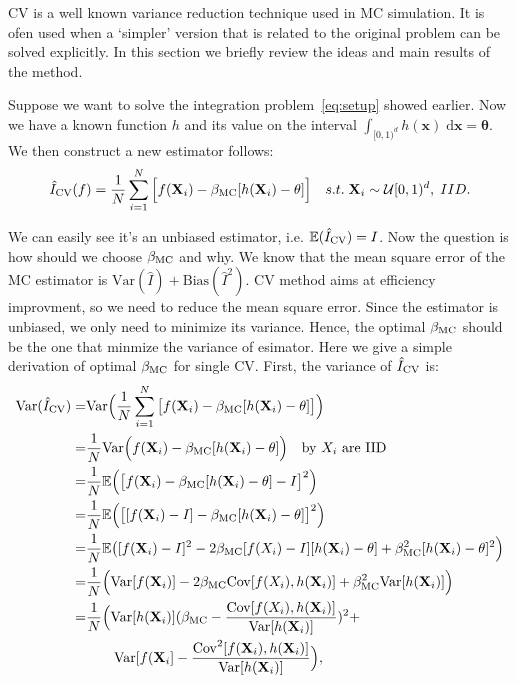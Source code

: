 
CV is a well known variance reduction technique used in MC simulation. 
It is ofen used when a `simpler' version that is related to the original problem can be solved explicitly. In this section we briefly review the ideas and main results of the method.
 
Suppose we want to solve the integration problem~\eqref{eq:setup} showed earlier. Now we have a known function $h$ and its value on the interval
$\int_{[0,1)^d} h(\mathbf{x})\;\textrm{d}\mathbf{x} = \mathbf{\theta}$. 
We then construct a new estimator follows:
\[\hat{I}_{\mathrm{CV}}(f)=\frac{1}{N}\sum_{i=1}^{N}\Big[ f(\mathbf{X}_i)-\beta_{\mathrm{MC}}[h(\mathbf{X}_i)-\theta] \Big] \quad s.t.\; \mathbf{X}_i\sim \mathcal{U}[0,1)^d, \;IID.\]

We can easily see it's an unbiased estimator, i.e. $\mathbb{E}(\hat{I}_{\mathrm{CV}}) = I$.
Now the question is how should we choose $\beta_{\mathrm{MC}}$ and why.
We know that the mean square error of the MC estimator is $\mathrm{Var}(\hat{I})+\mathrm{Bias}(\hat{I}^2)$. 
CV method aims at efficiency improvment, so we need to reduce the mean square error. 
Since the estimator is unbiased, we only need to minimize its variance.
Hence, the optimal $\beta_{\mathrm{MC}}$ should be the one that minmize the variance of esimator.
Here we give a simple derivation of optimal $\beta_{\mathrm{MC}}$ for single CV.
First, the variance of $\hat{I}_{\mathrm{CV}}$ is: 
\begin{align*}
	\mathrm{Var}(\hat{I}_{\mathrm{CV}})
    =&\mathrm{Var}\Big( \frac{1}{N}\sum_{i=1}^{N}\big[ f(\mathbf{X}_i)-\beta_{\mathrm{MC}}[h(\mathbf{X}_i)-\theta] \big]\Big)\\
    =&\frac{1}{N}\mathrm{Var}\Big(f(\mathbf{X}_i)-\beta_{\mathrm{MC}}[h(\mathbf{X}_i)-\theta]\Big)\quad \text{by $X_i$ are IID} \\
    =&\frac{1}{N}\mathbb{E}\Big(\big[f(\mathbf{X}_i)-\beta_{\mathrm{MC}}[h(\mathbf{X}_i)-\theta]-I\big]^2 \Big) \\
    =&\frac{1}{N}\mathbb{E}\Big(\big[ [f(\mathbf{X}_i)-I] -\beta_{\mathrm{MC}}[h(\mathbf{X}_i)-\theta]\big]^2 \Big) \\
    =&\frac{1}{N}\mathbb{E}\big([f(\mathbf{X}_i)-I]^2-2\beta_{\mathrm{MC}}[f(X_i)-I][h(\mathbf{X}_i)-\theta]+\beta_{\mathrm{MC}}^2[h(\mathbf{X}_i)-\theta]^2 \Big)\\
    =&\frac{1}{N}\Big(\mathrm{Var}[f(\mathbf{X}_i)]-2\beta_{\mathrm{MC}}\mathrm{Cov}[f(X_i),h(\mathbf{X}_i)]+\beta_{\mathrm{MC}}^2\mathrm{Var}[h(\mathbf{X}_i)]\Big)\\
    =&\frac{1}{N}\Big(\mathrm{Var}[h(\mathbf{X}_i)](\beta_{\mathrm{MC}}-\frac{\mathrm{Cov}[f(X_i),h(\mathbf{X}_i)]}{\mathrm{Var}[h(\mathbf{X}_i)]})^2+\\
     &\quad \quad \mathrm{Var}[f(\mathbf{X}_i]-\frac{\mathrm{Cov}^2[f(\mathbf{X}_i),h(\mathbf{X}_i)]}{\mathrm{Var}[h(\mathbf{X}_i)]} \Big),
\end{align*}
